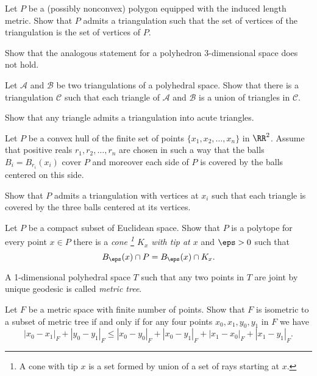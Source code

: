 \begin{pr}\label{pr:tringulation-of-poly} Let $P$ be a (possibly nonconvex) polygon
 equipped with the induced length metric.
Show that $P$ admits a triangulation
such that the set of vertices of the triangulation is the set of vertices of $P$. 
\end{pr}

\begin{pr}
\label{pr:tringulation-of-poly-3D}
Show that the analogous statement for a polyhedron 3-dimensional space does not hold.
\end{pr}



\begin{pr}\label{pr:2-triangulations}
Let $\mathcal{A}$ and $\mathcal{B}$ be two triangulations of a polyhedral space.
Show that there is a triangulation $\mathcal{C}$ such that each triangle of $\mathcal{A}$ and $\mathcal{B}$ is a union of triangles in $\mathcal{C}$.
\end{pr}


\begin{pr}\label{ex:acute-triangulation}
Show that any triangle admits a triangulation into acute triangles.
\end{pr}

\begin{pr}\label{pr:delaunay.triangulation}
Let $P$ be a convex hull of the finite set of points $\{x_1,x_2,\dots,x_n\}$ in $\RR^2$.
Assume that positive reals $r_1,r_2,\dots,r_n$ are chosen in such a way that the balls 
$B_i=B_{r_i}(x_i)$ cover $P$
and moreover each side of $P$ is covered by the balls centered on this side.

Show that $P$ admits a triangulation with vertices at $x_i$ such that each triangle is covered by the three balls centered at its vertices. 
\end{pr}


\begin{pr}\label{pr:polytope=local.cone}
Let $P$ be a compact subset of Euclidean space.
Show that $P$ is a polytope for every point $x\in P$
there is a \emph{cone%
\footnote{A cone with tip $x$ is a set formed by union of a set of rays starting at $x$.} $K_x$ with tip at $x$} and $\eps>0$
such that 
$$B_\eps(x)\cap P
=
B_\eps(x)\cap K_x.$$
 
\end{pr}

\begin{pr}
A 1-dimensional polyhedral space $T$ such that any two points in $T$ are joint by unique geodesic is called \emph{metric tree}.

Let $F$ be a metric space with finite number of points.
Show that $F$ is isometric to a subset of metric tree if and only if
for any four points $x_0,x_1,y_0,y_1$ in $F$
we have 
$$|x_0-x_1|_F+|y_0-y_1|_F
\le
|x_0-y_0|_F+|x_0-y_1|_F+|x_1-x_0|_F+|x_1-y_1|_F.$$
\end{pr}


